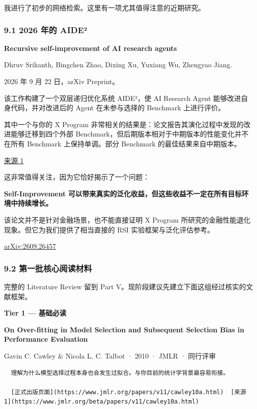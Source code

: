 我进行了初步的网络检索。这里有一项尤其值得注意的近期研究。

\hypertarget{part-1-07-0001-ux5e74ux7684-aideuxb2}{%
\subsubsection{9.1 2026 年的 AIDE²}\label{part-1-07-0001-ux5e74ux7684-aideuxb2}}

\textbf{Recursive self-improvement of AI research agents}

Dhruv Srikanth, Bingchen Zhao, Dixing Xu, Yuxiang Wu, Zhengyao Jiang.

2026 年 9 月 22 日，arXiv Preprint。

该工作构建了一个双层递归优化系统 AIDE²，使 AI Research Agent 能够改进自身代码，并对改进后的 Agent 在未参与选择的 Benchmark 上进行评价。

其中一个与你的 X Program 非常相关的结果是：论文报告其演化过程中发现的改进能够迁移到四个外部 Benchmark，但后期版本相对于中期版本的性能变化并不在所有 Benchmark 上保持单调。部分 Benchmark 的最佳结果来自中期版本。

\href{https://arxiv.org/abs/2609.26457}{来源 1}

这非常值得关注，因为它恰好揭示了一个问题：

\textbf{Self-Improvement 可以带来真实的泛化收益，但这些收益不一定在所有目标环境中持续增长。}

该论文并不是针对金融场景，也不能直接证明 X Program 所研究的金融性能退化现象。但它为我们提供了相当直接的 RSI 实验框架与泛化评估参考。

\href{https://arxiv.org/abs/2609.26457}{arXiv:2609.26457}

\hypertarget{part-1-07-0001-ux7b2cux4e00ux6279ux6838ux5fc3ux9605ux8bfbux6750ux6599}{%
\subsubsection{9.2 第一批核心阅读材料}\label{part-1-07-0001-ux7b2cux4e00ux6279ux6838ux5fc3ux9605ux8bfbux6750ux6599}}

完整的 Literature Review 留到 Part V。现阶段建议先建立下面这组经过核实的文献框架。

\textbf{Tier 1 --- 基础必读}

\textbf{On Over-fitting in Model Selection and Subsequent Selection Bias in Performance Evaluation}

Gavin C. Cawley \& Nicola L. C. Talbot · 2010 · JMLR · 同行评审

\begin{verbatim}
  理解为什么模型选择过程本身也会发生过拟合。与你目前的统计学背景最容易衔接。

  [正式出版页面](https://www.jmlr.org/papers/v11/cawley10a.html)  [来源 1](https://www.jmlr.org/beta/papers/v11/cawley10a.html)
\end{verbatim}

